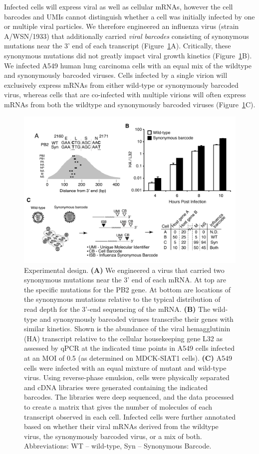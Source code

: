 \documentclass[9pt,lineno]{elife}
\begin{document}
Infected cells will express viral as well as cellular mRNAs, however the cell barcodes and UMIs cannot distinguish whether a cell was initially infected by one or multiple viral particles.
We therefore engineered an influenza virus (strain A/WSN/1933) that additionally carried \emph{viral barcodes} consisting of synonymous mutations near the 3' end of each transcript (Figure~\ref{fig:workflow}A).
Critically, these synonymous mutations did not greatly impact viral growth kinetics (Figure~\ref{fig:workflow}B).
We infected A549 human lung carcinoma cells with an equal mix of the wildtype and synonymously barcoded viruses.
Cells infected by a single virion will exclusively express mRNAs from either wild-type or synonymously barcoded virus, whereas cells that are co-infected with multiple virions will often express mRNAs from both the wildtype and synonymously barcoded viruses (Figure~\ref{fig:workflow}C).
\begin{figure}
\includegraphics[width=0.8\linewidth]{figures/Workflow/workflow.pdf}
\caption{\label{fig:workflow} Experimental design.
{\bf (A)}  
We engineered a virus that carried two synonymous mutations near the 3' end of each mRNA.
At top are the specific mutations for the PB2 gene.
At bottom are locations of the synonymous mutations relative to the typical distribution of read depth for the 3'-end sequencing of the mRNA.
{\bf (B)} 
The wild-type and synonymously barcoded viruses transcribe their genes with similar kinetics. 
Shown is the abundance of the viral hemagglutinin (HA) transcript relative to the cellular housekeeping gene L32 as assessed by qPCR at the indicated time points in A549 cells infected at an MOI of 0.5 (as determined on MDCK-SIAT1 cells).
{\bf (C)}  
A549 cells were infected with an equal mixture of mutant and wild-type virus. 
Using reverse-phase emulsion, cells were physically separated and cDNA libraries were generated containing the indicated barcodes. 
The libraries were deep sequenced, and the data processed to create a matrix that gives the number of molecules of each transcript observed in each cell.
Infected cells were further annotated based on whether their viral mRNAs derived from the wildtype virus, the synonymously barcoded virus, or a mix of both.
Abbreviations: WT -- wild-type, Syn -- Synonymous Barcode.
}
\end{figure}
\end{document}
